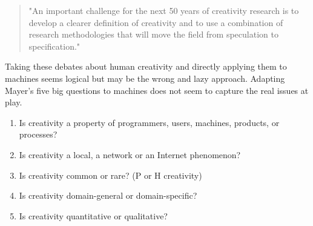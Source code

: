 \begin{quote}
  "An important challenge for the next 50 years of creativity research is to develop a clearer definition of creativity and to use a combination of research methodologies that will move the field from speculation to specification." \citep[p.459]{Mayer1999}
\end{quote}

Taking these debates about human creativity and directly applying them to machines seems logical but may be the wrong and lazy approach. Adapting Mayer’s five big questions to machines does not seem to capture the real issues at play.

\begin{enumerate}
  \item Is creativity a property of programmers, users, machines, products, or processes?
  \item Is creativity a local, a network or an Internet phenomenon?
  \item Is creativity common or rare? (P or H creativity)
  \item Is creativity domain-general or domain-specific?
  \item Is creativity quantitative or qualitative?
\end{enumerate}

